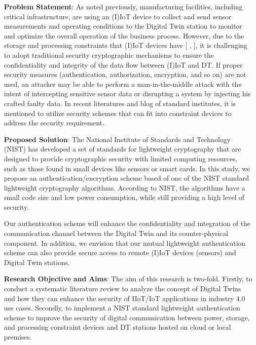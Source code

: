 \textbf{Problem Statement}:
As noted previously, manufacturing facilities, including critical infrastructure, are using an (I)IoT device to collect and send sensor measurements and operating conditions to the Digital Twin station to monitor and optimize the overall operation of the business process. However, due to the storage and processing constraints that (I)IoT devices have [ \cite{williams_survey_2022}, \cite{noauthor_lightweight_nodate}], it is challenging to adopt traditional security cryptographic mechanisms to ensure the confidentiality and integrity of the data flow between (I)IoT and DT. If proper security measures (authentication, authorization, encryption, and so on) are not used, an attacker may be able to perform a man-in-the-middle attack with the intent of intercepting sensitive sensor data or disrupting a system by injecting his crafted faulty data\cite{salimBlockchainEnabledSecureDigital2022}. In recent literatures and blog of standard institutes, it is mentioned to utilize security schemes that can fit into constraint devices to address the security requirement.  

\textbf{Proposed Solution}:
The National Institute of Standards and Technology (NIST) has developed a set of standards for lightweight cryptography that are designed to provide cryptographic security with limited computing resources, such as those found in small devices like sensors or smart cards.
In this study, we propose an authentication/encryption scheme based of one of the NIST standard lightweight cryptography algorithms. According to NIST\cite{noauthor_lightweight_nodate}, the algorithms have a small code size and low power consumption, while still providing a high level of security.

 Our authentication scheme will enhance the confidentiality and integration of the communication channel between the Digital Twin and its counter-physical component. In addition, we envision that our mutual lightweight authentication scheme can also provide secure access to remote (I)IoT devices (sensors) and  Digital Twin stations. 

\textbf{Research Objective and Aims}:
The aim of this research is two-fold. Firstly, to conduct a systematic literature review to analyze the concept of Digital Twins and how they can enhance the security of IIoT/IoT applications in industry 4.0 use cases. Secondly, to implement a NIST standard lightweight authentication scheme to improve the security of digital communication between power, storage, and processing constraint devices and DT stations hosted on cloud or local premises.


